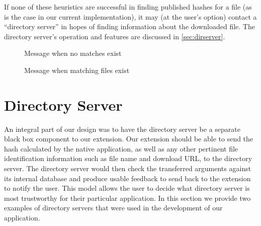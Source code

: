 \documentclass[letterpaper,twocolumn,10pt]{article}
\begin{document}
If none of these heuristics are successful in finding published hashes for a file (as is
the case in our current implementation), it may (at the user's option) contact
a ``directory server'' in hopes of finding information about the downloaded file.
The directory server's operation and features are discussed in \autoref{sec:dirserver}.

\begin{figure}
    \caption{Message when no matches exist}
    \label{fig:ss-none}
\end{figure}

\begin{figure}
    \caption{Message when matching files exist}
    \label{fig:ss-match}
\end{figure}

\section{Directory Server}
\label{sec:dirserver}

An integral part of our design was to have the directory server be a separate black box component to our extension. Our extension should be able to send the hash calculated by the native application, as well as any other pertinent file identification information such as file name and download URL, to the directory server. The directory server would then check the transferred arguments against its internal database and produce usable feedback to send back to the extension to notify the user. This model allows the user to decide what directory server is most trustworthy for their particular application. In this section we provide two examples of directory servers that were used in the development of our application.
\end{document}
